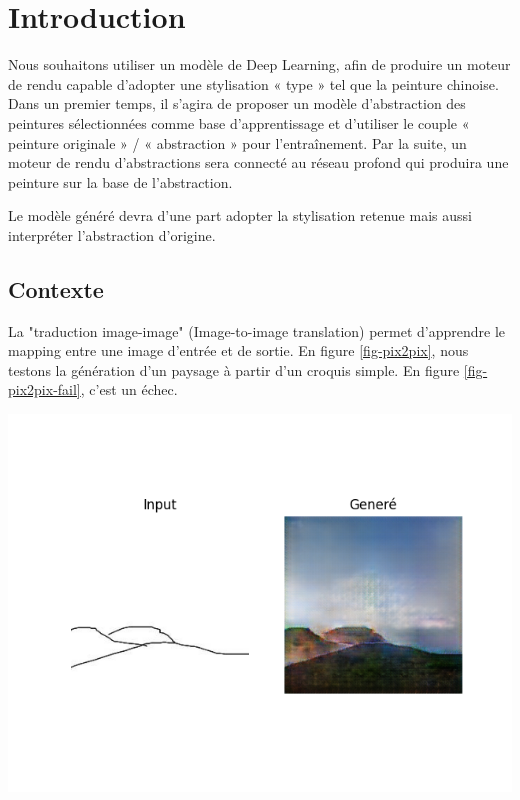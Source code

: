 \documentclass[a4paper, 12pt]{report}
\begin{document}
\tableofcontents

\chapter*{Introduction}

Nous souhaitons utiliser un modèle de Deep Learning, afin de produire un moteur de rendu capable d’adopter une stylisation « type » tel que la peinture chinoise. Dans un premier temps, il s’agira de proposer un modèle d’abstraction des peintures sélectionnées comme base d’apprentissage et d’utiliser le couple « peinture originale » / « abstraction » pour l’entraînement. Par la suite, un moteur de rendu d’abstractions sera connecté au réseau profond qui produira une peinture sur la base de l’abstraction.

Le modèle généré devra d'une part adopter la stylisation retenue mais aussi interpréter l'abstraction d'origine.

\section{Contexte}

La "traduction image-image" (Image-to-image translation) permet d'apprendre le mapping entre une image d'entrée et de sortie. En figure \ref{fig-pix2pix}, nous testons la génération d'un paysage à partir d'un croquis simple. En figure \ref{fig-pix2pix-fail}, c'est un échec.

\begin{center}
\includegraphics[width=0.7\linewidth]{images/pix2pix-t1.png}
\label{fig-pix2pix}
\end{center}
\end{document}
